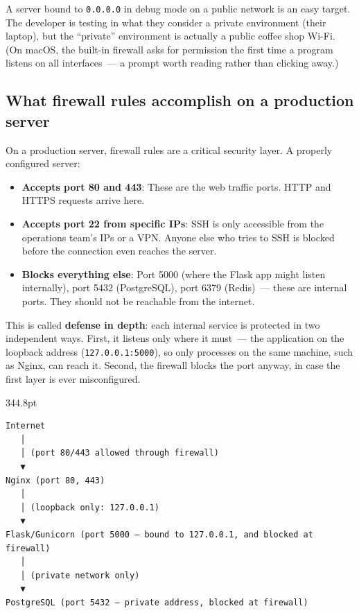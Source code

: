 \noindent{}A server bound to \texttt{0.0.0.0} in debug mode on a public network is an easy target. The developer is testing in what they consider a private environment (their laptop), but the ``private'' environment is actually a public coffee shop Wi-Fi. (On macOS, the built-in firewall asks for permission the first time a program listens on all interfaces~--- a prompt worth reading rather than clicking away.)

\subsection*{What firewall rules accomplish on a production server}\label{10-networking-limitations:what-firewall-rules-accomplish-on-a-production-server}

On a production server, firewall rules are a critical security layer. A properly configured server:

\begin{itemize}
\tightlist
\item
  \textbf{Accepts port 80 and 443}: These are the web traffic ports. HTTP and HTTPS requests arrive here.
\item
  \textbf{Accepts port 22 from specific IPs}: SSH is only accessible from the operations team's IPs or a VPN. Anyone else who tries to SSH is blocked before the connection even reaches the server.
\item
  \textbf{Blocks everything else}: Port 5000 (where the Flask app might listen internally), port 5432 (PostgreSQL), port 6379 (Redis)~--- these are internal ports. They should not be reachable from the internet.
\end{itemize}

\noindent{}This is called \textbf{defense in depth}: each internal service is protected in two independent ways. First, it listens only where it must~--- the application on the loopback address (\texttt{127.0.0.1:5000}), so only processes on the same machine, such as Nginx, can reach it. Second, the firewall blocks the port anyway, in case the first layer is ever misconfigured.

\begin{diagrambox}[short]{344.8pt}
\begin{Verbatim}[fontsize=\fontsize{9.0}{8.55}\selectfont]
Internet
   │
   │ (port 80/443 allowed through firewall)
   ▼
Nginx (port 80, 443)
   │
   │ (loopback only: 127.0.0.1)
   ▼
Flask/Gunicorn (port 5000 — bound to 127.0.0.1, and blocked at firewall)
   │
   │ (private network only)
   ▼
PostgreSQL (port 5432 — private address, blocked at firewall)
\end{Verbatim}
\end{diagrambox}

